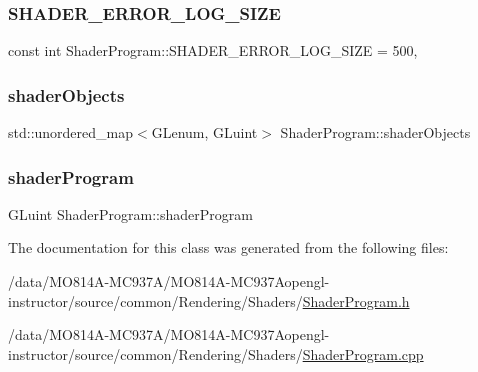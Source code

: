 \subsubsection{\texorpdfstring{S\+H\+A\+D\+E\+R\+\_\+\+E\+R\+R\+O\+R\+\_\+\+L\+O\+G\+\_\+\+S\+I\+ZE}{SHADER\_ERROR\_LOG\_SIZE}}
{\footnotesize\ttfamily const int Shader\+Program\+::\+S\+H\+A\+D\+E\+R\+\_\+\+E\+R\+R\+O\+R\+\_\+\+L\+O\+G\+\_\+\+S\+I\+ZE = 500\hspace{0.3cm}{\ttfamily [static]}, {\ttfamily [private]}}

\hypertarget{class_shader_program_a8eabcc4ff693bc9430daef8cfc6008de}{}\label{class_shader_program_a8eabcc4ff693bc9430daef8cfc6008de}
\subsubsection{\texorpdfstring{shader\+Objects}{shaderObjects}}
{\footnotesize\ttfamily std\+::unordered\+\_\+map$<$G\+Lenum, G\+Luint$>$ Shader\+Program\+::shader\+Objects\hspace{0.3cm}{\ttfamily [private]}}

\hypertarget{class_shader_program_a7d8f2b643a81ac4097606e43ade92f81}{}\label{class_shader_program_a7d8f2b643a81ac4097606e43ade92f81}
\subsubsection{\texorpdfstring{shader\+Program}{shaderProgram}}
{\footnotesize\ttfamily G\+Luint Shader\+Program\+::shader\+Program\hspace{0.3cm}{\ttfamily [protected]}}



The documentation for this class was generated from the following files\+:\begin{DoxyCompactItemize}
\item
/data/MO814A-MC937A/MO814A-MC937Aopengl-\/instructor/source/common/\+Rendering/\+Shaders/\hyperlink{_shader_program_8h}{Shader\+Program.\+h}\item
/data/MO814A-MC937A/MO814A-MC937Aopengl-\/instructor/source/common/\+Rendering/\+Shaders/\hyperlink{_shader_program_8cpp}{Shader\+Program.\+cpp}\end{DoxyCompactItemize}
